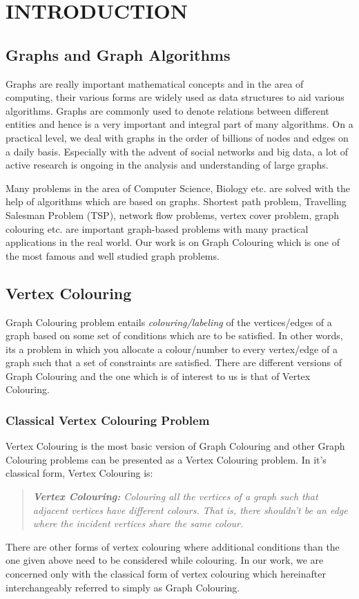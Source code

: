 \documentclass[MTech]{iitmdiss}
\begin{document}


\chapter{INTRODUCTION}
\label{chap:intro}
\section{Graphs and Graph Algorithms}
Graphs are really important mathematical concepts and in the area of computing, their various forms are widely used as data structures to aid various algorithms. Graphs are commonly used to denote relations between different entities and hence is a very important and integral part of many algorithms. On a practical level, we deal with graphs in the order of billions of nodes and edges on a daily basis. Especially with the advent of social networks and big data, a lot of active research is ongoing in the analysis and understanding of large graphs.

Many problems in the area of Computer Science, Biology etc. are solved with the help of algorithms which are based on graphs. Shortest path problem, Travelling Salesman Problem (TSP), network flow problems, vertex cover problem, graph colouring etc. are important graph-based problems with many practical applications in the real world. Our work is on Graph Colouring which is one of the most famous and well studied graph problems.
\section{Vertex Colouring}
Graph Colouring problem entails \textit{colouring/labeling} of the vertices/edges of a graph based on some set of conditions which are to be satisfied. In other words, its a problem in which you allocate a colour/number to every vertex/edge of a graph such that a set of constraints are satisfied. There are different versions of Graph Colouring and the one which is of interest to us is that of Vertex Colouring.
\subsection{Classical Vertex Colouring Problem}
Vertex Colouring is the most basic version of Graph Colouring and other Graph Colouring problems can be presented as a Vertex Colouring problem. In it's classical form, Vertex Colouring is:
\begin{verse}
\textit{\textbf{Vertex Colouring:} Colouring all the vertices of a graph such that adjacent vertices have different colours. That is, there shouldn't be an edge where the incident vertices share the same colour.}
\end{verse}
There are other forms of vertex colouring where additional conditions than the one given above need to be considered while colouring. In our work, we are concerned only with the classical form of vertex colouring which hereinafter interchangeably referred to simply as Graph Colouring.
\end{document}
